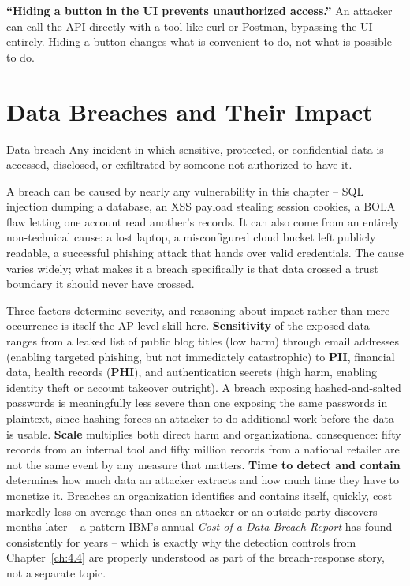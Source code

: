 \begin{misconception}
\textbf{``Hiding a button in the UI prevents unauthorized access.''} An attacker can call the API
directly with a tool like curl or Postman, bypassing the UI entirely. Hiding a button changes what
is convenient to do, not what is possible to do.
\end{misconception}

\section{Data Breaches and Their Impact}

\begin{definition}{Data breach}
Any incident in which sensitive, protected, or confidential data is accessed, disclosed, or
exfiltrated by someone not authorized to have it.
\end{definition}

A breach can be caused by nearly any vulnerability in this chapter -- SQL injection dumping a
database, an XSS payload stealing session cookies, a BOLA flaw letting one account read another's
records. It can also come from an entirely non-technical cause: a lost laptop, a misconfigured
cloud bucket left publicly readable, a successful phishing attack that hands over valid
credentials. The cause varies widely; what makes it a breach specifically is that data crossed a
trust boundary it should never have crossed.

Three factors determine severity, and reasoning about impact rather than mere occurrence is itself
the AP-level skill here. \textbf{Sensitivity} of the exposed data ranges from a leaked list of
public blog titles (low harm) through email addresses (enabling targeted phishing, but not
immediately catastrophic) to \textbf{PII}, financial data, health records (\textbf{PHI}), and
authentication secrets (high harm, enabling identity theft or account takeover outright). A
breach exposing hashed-and-salted passwords is meaningfully less severe than one exposing the same
passwords in plaintext, since hashing forces an attacker to do additional work before the data is
usable. \textbf{Scale} multiplies both direct harm and organizational consequence: fifty records
from an internal tool and fifty million records from a national retailer are not the same event by
any measure that matters. \textbf{Time to detect and contain} determines how much data an attacker
extracts and how much time they have to monetize it. Breaches an organization identifies and
contains itself, quickly, cost markedly less on average than ones an attacker or an outside party
discovers months later -- a pattern IBM's annual \emph{Cost of a Data Breach Report} has found
consistently for years -- which is exactly why the detection controls from
Chapter~\ref{ch:4.4} are properly understood as part of the breach-response story, not a separate
topic.

